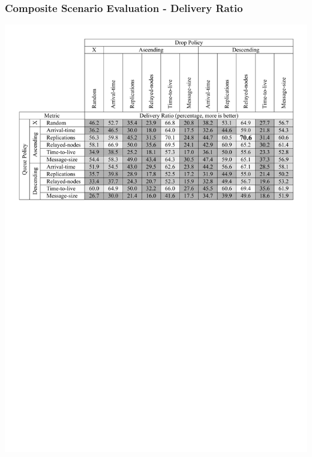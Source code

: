 \begin{frame}
  \frametitle{Composite Scenario Evaluation - Delivery Ratio}
  \begin{center}
   \includegraphics[width=1.0\textwidth]{fig/tables/scenario4_part1.pdf}
  \end{center}
\end{frame}

